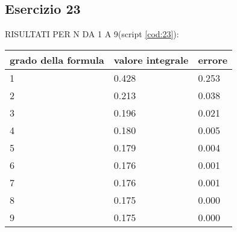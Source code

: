 \newpage
\subsection{Esercizio 23}


RISULTATI PER N DA 1 A 9(script \ref{cod:23}):

\begin{table}[h]
    \begin{tabular}{|l l l|}
        \hline
        grado della formula & valore integrale & errore\\
        \hline
        1 & 0.428 & 0.253\\
        2 & 0.213 & 0.038\\
        3 & 0.196 & 0.021\\
        4 & 0.180 & 0.005\\
        5 & 0.179 & 0.004\\
        6 & 0.176 & 0.001\\
        7 & 0.176 & 0.001\\
        8 & 0.175 & 0.000\\
        9 & 0.175 & 0.000\\
        \hline
    \end{tabular}
\end{table}
   
